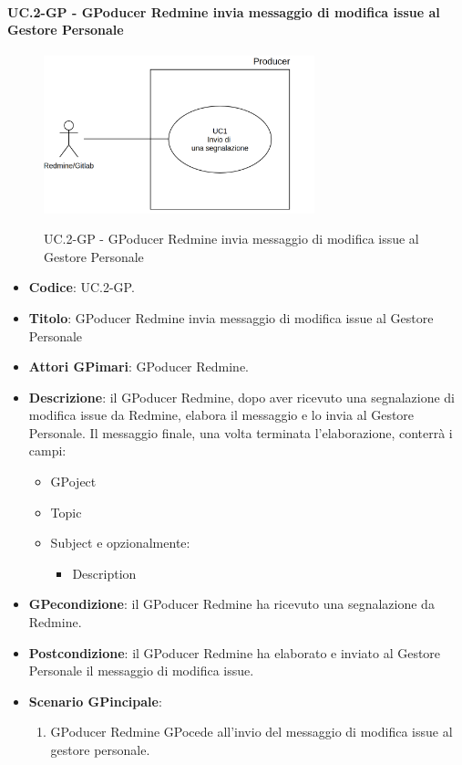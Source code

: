 	\paragraph{UC\theuccount.2-GP - GPoducer Redmine invia messaggio di modifica issue al Gestore Personale}
	\begin{figure}[H]
		\centering
		\includegraphics[width=0.7\textwidth]{img/UC1.png}\\
		\caption{UC\theuccount.2-GP - GPoducer Redmine invia messaggio di modifica issue al Gestore Personale}
	\end{figure}
	\begin{itemize}
		\item \textbf{Codice}: UC\theuccount.2-GP.
		\item \textbf{Titolo}: GPoducer Redmine invia messaggio di modifica issue al Gestore Personale
		\item \textbf{Attori GPimari}: GPoducer Redmine.
		\item \textbf{Descrizione}: il GPoducer Redmine, dopo aver
		ricevuto una segnalazione di modifica issue da Redmine, elabora
		il messaggio e lo invia al Gestore Personale.
		Il messaggio finale, una volta terminata l'elaborazione, conterrà i campi:
		\begin{itemize}
			\item GPoject
			\item Topic
			\item Subject e opzionalmente:
			\begin{itemize}
				\item Description
			\end{itemize}
		\end{itemize}
		\item \textbf{GPecondizione}: il GPoducer Redmine ha ricevuto una segnalazione da Redmine.
		\item \textbf{Postcondizione}: il GPoducer Redmine ha elaborato e inviato al Gestore Personale il messaggio di modifica issue.
		\item \textbf{Scenario GPincipale}: 
		\begin{enumerate}
			\item GPoducer Redmine GPocede all'invio del messaggio di
			modifica issue al gestore personale.
		\end{enumerate}
		
	\end{itemize}